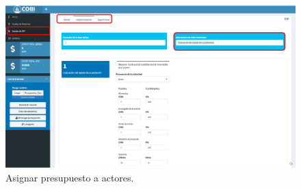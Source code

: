 \documentclass[
]{book}
\begin{document}
\begin{figure}
\includegraphics[width=61.11in]{images/up-4} \caption{Asignar presupuesto a actores.}\label{fig:up-4}
\end{figure}

  
\end{document}
